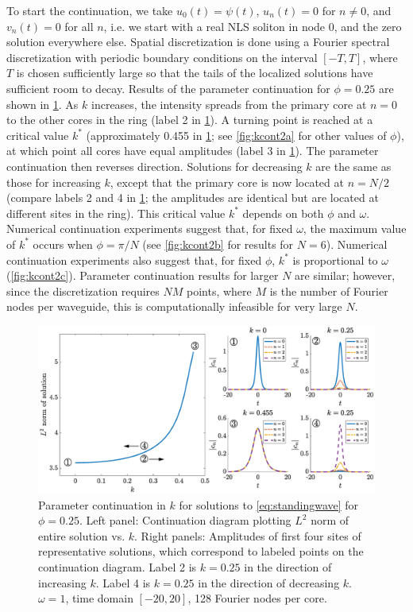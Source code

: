 \documentclass[11pt,reqno]{amsart}
\begin{document}
To start the continuation, we take $u_0(t) = \psi(t)$, $u_n(t) = 0$ for $n \neq 0$, and $v_n(t) = 0$ for all $n$, i.e. we start with a real NLS soliton in node 0, and the zero solution everywhere else. Spatial discretization is done using a Fourier spectral discretization with periodic boundary conditions on the interval $[-T,T]$, where $T$ is chosen sufficiently large so that the tails of the localized solutions have sufficient room to decay. Results of the parameter continuation for $\phi = 0.25$ are shown in \cref{fig:kcont}. As $k$ increases, the intensity spreads from the primary core at $n=0$ to the other cores in the ring (label 2 in \cref{fig:kcont}). A turning point is reached at a critical value $k^*$ (approximately 0.455 in \cref{fig:kcont}; see \cref{fig:kcont2a} for other values of $\phi$), at which point all cores have equal amplitudes (label 3 in \cref{fig:kcont}). The parameter continuation then reverses direction. Solutions for decreasing $k$ are the same as those for increasing $k$, except that the primary core is now located at $n=N/2$ (compare labels 2 and 4 in \cref{fig:kcont}; the amplitudes are identical but are located at different sites in the ring). This critical value $k^*$ depends on both $\phi$ and $\omega$. Numerical continuation experiments suggest that, for fixed $\omega$, the maximum value of $k^*$ occurs when $\phi = \pi/N$ (see \cref{fig:kcont2b} for results for $N=6$). Numerical continuation experiments also suggest that, for fixed $\phi$, $k^*$ is proportional to $\omega$ (\cref{fig:kcont2c}). Parameter continuation results for larger $N$ are similar; however, since the discretization requires $NM$ points, where $M$ is the number of Fourier nodes per waveguide, this is computationally infeasible for very large $N$.

\begin{figure}
    \centering
    \includegraphics[width=16cm]{contdiag.eps}
    \caption{Parameter continuation in $k$ for solutions to \cref{eq:standingwave} for $\phi=0.25$. Left panel: Continuation diagram plotting $L^2$ norm of entire solution vs. $k$. Right panels: Amplitudes of first four sites of representative solutions, which correspond to labeled points on the continuation diagram. Label 2 is $k=0.25$ in the direction of increasing $k$. Label 4 is $k=0.25$ in the direction of decreasing $k$. $\omega=1$, time domain $[-20,20]$, 128 Fourier nodes per core.}
    \label{fig:kcont}
\end{figure}
\end{document}
